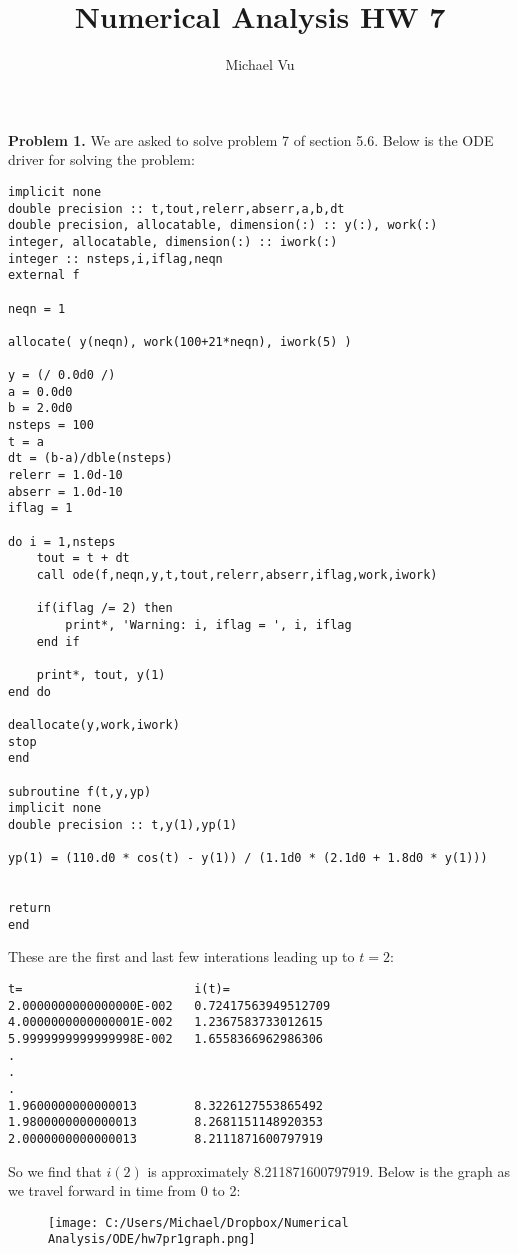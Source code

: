\documentclass[12pt]{article}
\author{Michael Vu}
\title{Numerical Analysis HW 7}
\begin{document}
\maketitle 

\textbf{Problem 1.} We are asked to solve problem 7 of section 5.6. Below is the ODE driver for solving the problem:

\begin{verbatim}
implicit none
double precision :: t,tout,relerr,abserr,a,b,dt
double precision, allocatable, dimension(:) :: y(:), work(:)
integer, allocatable, dimension(:) :: iwork(:)
integer :: nsteps,i,iflag,neqn
external f

neqn = 1

allocate( y(neqn), work(100+21*neqn), iwork(5) )

y = (/ 0.0d0 /)
a = 0.0d0
b = 2.0d0
nsteps = 100
t = a
dt = (b-a)/dble(nsteps)
relerr = 1.0d-10
abserr = 1.0d-10
iflag = 1

do i = 1,nsteps
	tout = t + dt
	call ode(f,neqn,y,t,tout,relerr,abserr,iflag,work,iwork)
	
	if(iflag /= 2) then
		print*, 'Warning: i, iflag = ', i, iflag
	end if
	
	print*, tout, y(1)
end do

deallocate(y,work,iwork)
stop
end

subroutine f(t,y,yp)
implicit none
double precision :: t,y(1),yp(1)

yp(1) = (110.d0 * cos(t) - y(1)) / (1.1d0 * (2.1d0 + 1.8d0 * y(1)))


return
end
\end{verbatim}

These are the first and last few interations leading up to $t=2$:

\begin{verbatim}
t=                        i(t)=
2.0000000000000000E-002   0.72417563949512709
4.0000000000000001E-002   1.2367583733012615
5.9999999999999998E-002   1.6558366962986306
.
.
.
1.9600000000000013        8.3226127553865492
1.9800000000000013        8.2681151148920353
2.0000000000000013        8.2111871600797919 
\end{verbatim}

So we find that $i(2)$ is approximately 8.211871600797919. Below is the graph as we travel forward in time from 0 to 2:

\begin{figure}[htbp]
	\centering
		\texttt{[image: C:/Users/Michael/Dropbox/Numerical Analysis/ODE/hw7pr1graph.png]}
	\label{fig:hw7pr1graph}
\end{figure}
\end{document}
